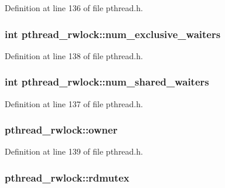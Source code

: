 Definition at line 136 of file pthread.\+h.

\hypertarget{structpthread__rwlock_a5d8b56e7998376aa9f5908a560daadb7}{
\subsubsection[{num\+\_\+exclusive\+\_\+waiters}]{\setlength{\rightskip}{0pt plus 5cm}int pthread\+\_\+rwlock\+::num\+\_\+exclusive\+\_\+waiters}}\label{structpthread__rwlock_a5d8b56e7998376aa9f5908a560daadb7}


Definition at line 138 of file pthread.\+h.

\hypertarget{structpthread__rwlock_af637581bd0ea0328763d041937160fff}{
\subsubsection[{num\+\_\+shared\+\_\+waiters}]{\setlength{\rightskip}{0pt plus 5cm}int pthread\+\_\+rwlock\+::num\+\_\+shared\+\_\+waiters}}\label{structpthread__rwlock_af637581bd0ea0328763d041937160fff}


Definition at line 137 of file pthread.\+h.

\hypertarget{structpthread__rwlock_a7918a35d8e929df9c7f1fd9f12e9efcf}{
\subsubsection[{owner}]{ pthread\+\_\+rwlock\+::owner}}\label{structpthread__rwlock_a7918a35d8e929df9c7f1fd9f12e9efcf}


Definition at line 139 of file pthread.\+h.

\hypertarget{structpthread__rwlock_aa525fa5ae59171418ede7d1894bf21fe}{
\subsubsection[{rdmutex}]{ pthread\+\_\+rwlock\+::rdmutex}}\label{structpthread__rwlock_aa525fa5ae59171418ede7d1894bf21fe}


